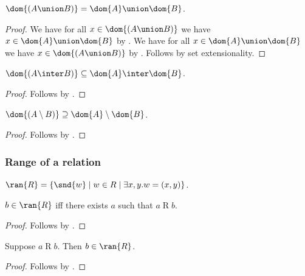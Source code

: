 \begin{proposition}\label{dom_union}
    $\dom{(A\union B)} = \dom{A}\union\dom{B}$.
\end{proposition}
\begin{proof}
    We have for all $x\in\dom{(A\union B)}$
        we have $x\in\dom{A}\union\dom{B}$
        by .
    We have for all $x\in\dom{A}\union\dom{B}$
        we have $x\in\dom{(A\union B)}$
        by .
    Follows by set extensionality.
\end{proof}

\begin{proposition}\label{dom_inter}
    $\dom{(A\inter B)}\subseteq \dom{A}\inter\dom{B}$.
\end{proposition}
\begin{proof}
    Follows by .
\end{proof}

\begin{proposition}\label{dom_setminus}
    $\dom{(A\setminus B)}\supseteq \dom{A}\setminus\dom{B}$.
\end{proposition}
\begin{proof}
    Follows by .
\end{proof}

\subsubsection{Range of a relation}

\begin{definition}\label{ran}
    $\ran{R} = \{ \snd{w}\mid w\in R\mid \exists x, y. w = (x, y)\}$.
\end{definition}

\begin{proposition}\label{ran_iff}
    $b\in\ran{R}$ iff there exists $a$ such that $a\mathrel{R} b$.
\end{proposition}
\begin{proof}
    Follows by .
\end{proof}

\begin{proposition}\label{ran_intro}
    Suppose $a\mathrel{R} b$.
    Then $b\in\ran{R}$.
\end{proposition}
\begin{proof}
    Follows by .
\end{proof}

